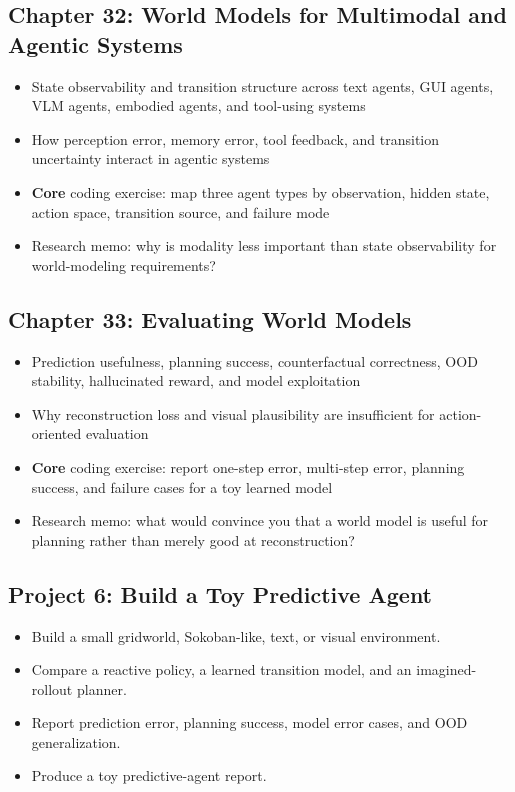 \documentclass[11pt]{article}
\begin{document}
\subsection{Chapter 32: World Models for Multimodal and Agentic Systems}

\begin{itemize}
    \item State observability and transition structure across text agents, GUI agents, VLM agents, embodied agents, and tool-using systems
    \item How perception error, memory error, tool feedback, and transition uncertainty interact in agentic systems
    \item \textbf{Core} coding exercise: map three agent types by observation, hidden state, action space, transition source, and failure mode
    \item Research memo: why is modality less important than state observability for world-modeling requirements?
\end{itemize}

\subsection{Chapter 33: Evaluating World Models}

\begin{itemize}
    \item Prediction usefulness, planning success, counterfactual correctness, OOD stability, hallucinated reward, and model exploitation
    \item Why reconstruction loss and visual plausibility are insufficient for action-oriented evaluation
    \item \textbf{Core} coding exercise: report one-step error, multi-step error, planning success, and failure cases for a toy learned model
    \item Research memo: what would convince you that a world model is useful for planning rather than merely good at reconstruction?
\end{itemize}

\subsection{Project 6: Build a Toy Predictive Agent}

\begin{itemize}
    \item Build a small gridworld, Sokoban-like, text, or visual environment.
    \item Compare a reactive policy, a learned transition model, and an imagined-rollout planner.
    \item Report prediction error, planning success, model error cases, and OOD generalization.
    \item Produce a toy predictive-agent report.
\end{itemize}
\end{document}
